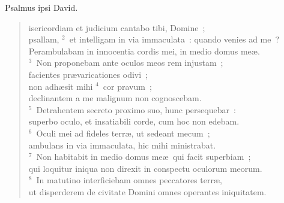 \bchapter[Psalm]
Psalmus ipsi David. \begin{verse}isericordiam et judicium cantabo tibi, Domine~;\\ psallam,
${}^{2}$~et intelligam in via immaculata~: quando venies ad me~?\\ Perambulabam in innocentia cordis mei, in medio domus me\ae .\\
${}^{3}$~Non proponebam ante oculos meos rem injustam~;\\ facientes pr\ae varicationes odivi~;\\ non adh\ae sit mihi
${}^{4}$~cor pravum~;\\ declinantem a me malignum non cognoscebam.\\
${}^{5}$~Detrahentem secreto proximo suo, hunc persequebar~:\\ superbo oculo, et insatiabili corde, cum hoc non edebam.\\
${}^{6}$~Oculi mei ad fideles terr\ae , ut sedeant mecum~;\\ ambulans in via immaculata, hic mihi ministrabat.\\
${}^{7}$~Non habitabit in medio domus me\ae\ qui facit superbiam~;\\ qui loquitur iniqua non direxit in conspectu oculorum meorum.\\
${}^{8}$~In matutino interficiebam omnes peccatores terr\ae ,\\ ut disperderem de civitate Domini omnes operantes iniquitatem.\end{verse}



